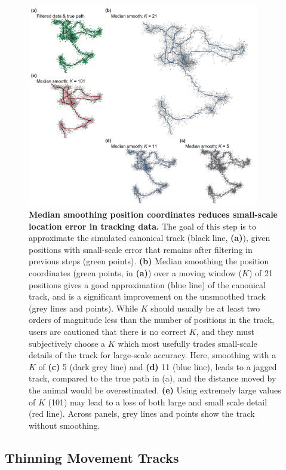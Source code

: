 \begin{figure}[ht!]
    \centering
    \includegraphics[width=0.9\textwidth]{figures/preprocessing/fig_04.png}
    \caption{
        \textbf{Median smoothing position coordinates reduces small-scale location error in tracking data.}
        The goal of this step is to approximate the simulated canonical track (black line, \textbf{(a)}), given positions with small-scale error that remains after filtering in previous steps (green points).
        \textbf{(b)} Median smoothing the position coordinates (green points, in \textbf{(a)}) over a moving window ($K$) of 21 positions gives a good approximation (blue line) of the canonical track, and is a significant improvement on the unsmoothed track (grey lines and points).
        While $K$ should usually be at least two orders of magnitude less than the number of positions in the track, users are cautioned that there is no correct $K$, and they must subjectively choose a $K$ which most usefully trades small-scale details of the track for large-scale accuracy.
        Here, smoothing with a $K$ of \textbf{(c)} 5 (dark grey line) and \textbf{(d)} 11 (blue line), leads to a jagged track, compared to the true path in (a), and the distance moved by the animal would be overestimated.
        \textbf{(e)} Using extremely large values of $K$ (101) may lead to a loss of both large and small scale detail (red line).
        Across panels, grey lines and points show the track without smoothing.
    }
    \label{preproc_fig_04}
\end{figure}

\subsection*{Thinning Movement Tracks}

